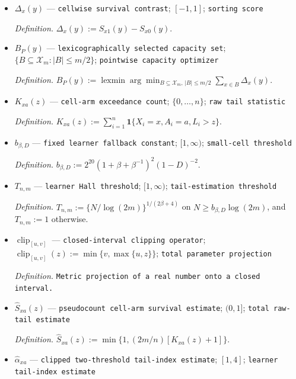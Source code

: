 \documentclass{article}
\begin{document}
\begin{itemize}
  \par\smallskip\noindent\emph{Definition.} Unique solution of \(M_P^{\pi}(\bar t_P^{\pi})=\tau\).
  \item \(\Delta_x(y)\) --- \texttt{cellwise survival contrast}; \([-1,1]\); \texttt{sorting score}
  \par\smallskip\noindent\emph{Definition.} \(\Delta_x(y):=S_{x1}(y)-S_{x0}(y)\).
  \item \(B_P(y)\) --- \texttt{lexicographically selected capacity set}; \(\{B\subseteq\mathcal X_m:|B|\le m/2\}\); \texttt{pointwise capacity optimizer}
  \par\smallskip\noindent\emph{Definition.} \(B_P(y):=\operatorname{lexmin}\arg\min_{B\subseteq\mathcal X_m,\,|B|\le m/2}\sum_{x\in B}\Delta_x(y)\).
  \item \(K_{xa}(z)\) --- \texttt{cell-\allowbreak{}arm exceedance count}; \(\{0,\ldots,n\}\); \texttt{raw tail statistic}
  \par\smallskip\noindent\emph{Definition.} \(K_{xa}(z):=\sum_{i=1}^n\mathbf 1\{X_i=x,A_i=a,L_i>z\}\).
  \item \(b_{\beta,D}\) --- \texttt{fixed learner fallback constant}; \([1,\infty)\); \texttt{small-\allowbreak{}cell threshold}
  \par\smallskip\noindent\emph{Definition.} \(b_{\beta,D}:=2^{20}(1+\beta+\beta^{-1})^2(1-D)^{-2}\).
  \item \(T_{n,m}\) --- \texttt{learner Hall threshold}; \([1,\infty)\); \texttt{tail-\allowbreak{}estimation threshold}
  \par\smallskip\noindent\emph{Definition.} \(T_{n,m}:=\{N/\log(2m)\}^{1/(2\beta+4)}\) on \(N\ge b_{\beta,D}\log(2m)\), and \(T_{n,m}:=1\) otherwise.
  \item \(\operatorname{clip}_{[u,v]}\) --- \texttt{closed-\allowbreak{}interval clipping operator}; \(\operatorname{clip}_{[u,v]}(z):=\min\{v,\max\{u,z\}\}\); \texttt{total parameter projection}
  \par\smallskip\noindent\emph{Definition.} \texttt{Metric projection of a real number onto a closed interval.}
  \item \(\widehat S_{xa}(z)\) --- \texttt{pseudocount cell-\allowbreak{}arm survival estimate}; \((0,1]\); \texttt{total raw-\allowbreak{}tail estimate}
  \par\smallskip\noindent\emph{Definition.} \(\widehat S_{xa}(z):=\min\{1,(2m/n)[K_{xa}(z)+1]\}\).
  \item \(\widehat\alpha_{xa}\) --- \texttt{clipped two-\allowbreak{}threshold tail-\allowbreak{}index estimate}; \([1,4]\); \texttt{learner tail-\allowbreak{}index estimate}

\end{itemize}
\end{document}
